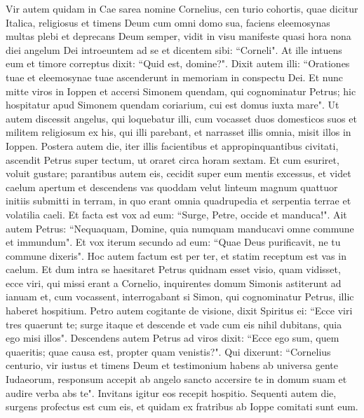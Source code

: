 \begin{biblechapter}  
\verse Vir autem quidam in Cae sarea nomine Cornelius, cen turio cohortis, quae dicitur Italica, 
\verse religiosus et timens Deum cum omni domo sua, faciens eleemosynas multas plebi et deprecans Deum semper, 
\verse vidit in visu manifeste quasi hora nona diei angelum Dei introeuntem ad se et dicentem sibi: “Corneli". 
\verse At ille intuens eum et timore correptus dixit: “Quid est, domine?". Dixit autem illi: “Orationes tuae et eleemosynae tuae ascenderunt in memoriam in conspectu Dei. 
\verse Et nunc mitte viros in Ioppen et accersi Simonem quendam, qui cognominatur Petrus; 
\verse hic hospitatur apud Simonem quendam coriarium, cui est domus iuxta mare". 
\verse Ut autem discessit angelus, qui loquebatur illi, cum vocasset duos domesticos suos et militem religiosum ex his, qui illi parebant, 
\verse et narrasset illis omnia, misit illos in Ioppen. 
\verse Postera autem die, iter illis facientibus et appropinquantibus civitati, ascendit Petrus super tectum, ut oraret circa horam sextam. 
\verse Et cum esuriret, voluit gustare; parantibus autem eis, cecidit super eum mentis excessus, 
\verse et videt caelum apertum et descendens vas quoddam velut linteum magnum quattuor initiis submitti in terram, 
\verse in quo erant omnia quadrupedia et serpentia terrae et volatilia caeli. 
\verse Et facta est vox ad eum: “Surge, Petre, occide et manduca!". 
\verse Ait autem Petrus: “Nequaquam, Domine, quia numquam manducavi omne commune et immundum". 
\verse Et vox iterum secundo ad eum: “Quae Deus purificavit, ne tu commune dixeris". 
\verse Hoc autem factum est per ter, et statim receptum est vas in caelum. 
\verse Et dum intra se haesitaret Petrus quidnam esset visio, quam vidisset, ecce viri, qui missi erant a Cornelio, inquirentes domum Simonis astiterunt ad ianuam 
\verse et, cum vocassent, interrogabant si Simon, qui cognominatur Petrus, illic haberet hospitium. 
\verse Petro autem cogitante de visione, dixit Spiritus ei: “Ecce viri tres quaerunt te; 
\verse surge itaque et descende et vade cum eis nihil dubitans, quia ego misi illos". 
\verse Descendens autem Petrus ad viros dixit: “Ecce ego sum, quem quaeritis; quae causa est, propter quam venistis?".  
\verse Qui dixerunt: “Cornelius centurio, vir iustus et timens Deum et testimonium habens ab universa gente Iudaeorum, responsum accepit ab angelo sancto accersire te in domum suam et audire verba abs te". 
\verse Invitans igitur eos recepit hospitio. Sequenti autem die, surgens profectus est cum eis, et quidam ex fratribus ab Ioppe comitati sunt eum. 

\end{biblechapter}

